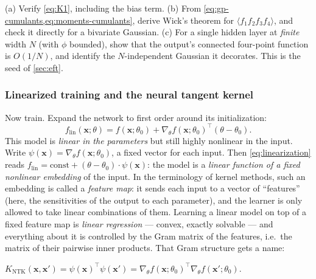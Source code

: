 \documentclass[11pt]{article}
\newcommand{\bv}[1]{\boldsymbol{#1}}
\newcommand{\ntk}{K_{\mathrm{NTK}}}
\begin{document}
\begin{exercise}
\label{ex:gp}
(a) Verify \cref{eq:K1}, including the bias term. (b) From
\cref{eq:gp-cumulants,eq:moments-cumulants}, derive Wick's theorem for
$\langle f_1 f_2 f_3 f_4 \rangle$, and check it directly for a bivariate
Gaussian. (c) For a single hidden layer at \emph{finite} width $N$ (with
$\phi$ bounded), show that the output's connected four-point function is
$O(1/N)$, and identify the $N$-independent Gaussian it decorates. This is
the seed of \cref{sec:eft}.
\end{exercise}

\subsubsection{Linearized training and the neural tangent kernel}

Now train. Expand the network to first order around its initialization:
\begin{equation}
  \label{eq:linearization}
  f_{\mathrm{lin}}(\bv{x};\theta) = f(\bv{x};\theta_0)
  + \nabla_\theta f(\bv{x};\theta_0)^{\top}(\theta - \theta_0).
\end{equation}
This model is \emph{linear in the parameters} but still highly nonlinear
in the input. Write $\psi(\bv{x}) = \nabla_\theta f(\bv{x};\theta_0)$, a
fixed vector for each input. Then \cref{eq:linearization} reads
$f_{\mathrm{lin}} = \text{const} + (\theta - \theta_0)\cdot\psi(\bv{x})$:
the model is a \emph{linear function of a fixed nonlinear embedding} of
the input. In the terminology of kernel methods, such an embedding is
called a \emph{feature map}: it sends each input to a vector of
``features'' (here, the sensitivities of the output to each parameter),
and the learner is only allowed to take linear combinations of them.
Learning a linear model on top of a fixed feature map is \emph{linear
regression} --- convex, exactly solvable --- and everything about it is
controlled by the Gram matrix of the features, i.e.\ the matrix of their
pairwise inner products. That Gram structure gets a name:

\begin{definition}
\label{def:ntk}
$\displaystyle
  \ntk(\bv{x},\bv{x}') = \psi(\bv{x})^{\top}\psi(\bv{x}')
  = \nabla_{\theta} f(\bv{x};\theta_{0})^{\top}
  \nabla_{\theta} f(\bv{x}';\theta_{0})$.
\end{definition}
\end{document}

